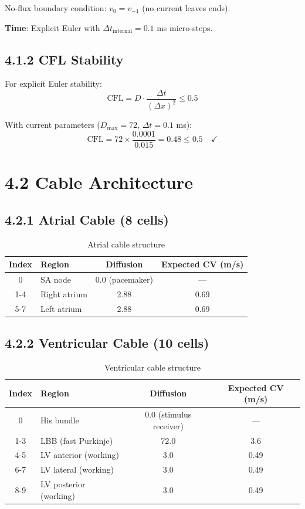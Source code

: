 \documentclass[12pt,oneside,a4paper]{book}
\begin{document}
No-flux boundary condition: $v_0 = v_{-1}$ (no current leaves ends).

\textbf{Time}: Explicit Euler with $\Delta t_{\text{internal}} = 0.1$ ms micro-steps.

\subsection{4.1.2 CFL Stability}

For explicit Euler stability:
$$\text{CFL} = D \cdot \frac{\Delta t}{(\Delta x)^2} \leq 0.5$$

With current parameters ($D_{\max} = 72$, $\Delta t = 0.1$ ms):
$$\text{CFL} = 72 \times \frac{0.0001}{0.015} = 0.48 \leq 0.5 \quad \checkmark$$

\section{4.2 Cable Architecture}

\subsection{4.2.1 Atrial Cable (8 cells)}

\begin{table}[H]
\centering
\begin{tabularx}{\textwidth}{|c|X|c|c|}
\hline
Index & Region & Diffusion & Expected CV (m/s) \\
\hline
0 & SA node & 0.0 (pacemaker) & — \\
1-4 & Right atrium & 2.88 & 0.69 \\
5-7 & Left atrium & 2.88 & 0.69 \\
\hline
\end{tabularx}
\caption{Atrial cable structure}
\label{tab:atrial_struct}
\end{table}

\subsection{4.2.2 Ventricular Cable (10 cells)}

\begin{table}[H]
\centering
\begin{tabularx}{\textwidth}{|c|X|c|c|}
\hline
Index & Region & Diffusion & Expected CV (m/s) \\
\hline
0 & His bundle & 0.0 (stimulus receiver) & — \\
1-3 & LBB (fast Purkinje) & 72.0 & 3.6 \\
4-5 & LV anterior (working) & 3.0 & 0.49 \\
6-7 & LV lateral (working) & 3.0 & 0.49 \\
8-9 & LV posterior (working) & 3.0 & 0.49 \\
\hline
\end{tabularx}
\caption{Ventricular cable structure}
\label{tab:ventricular_struct}
\end{table}
\end{document}
